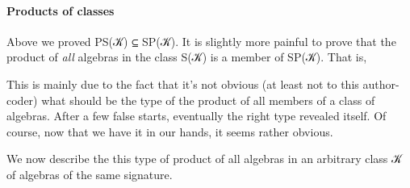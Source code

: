 \paragraph{Products of classes}\label{products-of-classes}

Above we proved PS(𝒦) ⊆ SP(𝒦). It is slightly more painful to prove that
the product of \emph{all} algebras in the class S(𝒦) is a member of
SP(𝒦). That is,

\begin{Shaded}
\begin{Highlighting}[]
\OtherTok{(}\OtherTok{)}\OtherTok{(}\OtherTok{)}
\end{Highlighting}
\end{Shaded}

This is mainly due to the fact that it's not obvious (at least not to
this author-coder) what should be the type of the product of all members
of a class of algebras. After a few false starts, eventually the right
type revealed itself. Of course, now that we have it in our hands, it
seems rather obvious.

We now describe the this type of product of all algebras in an arbitrary
class 𝒦 of algebras of the same signature.

